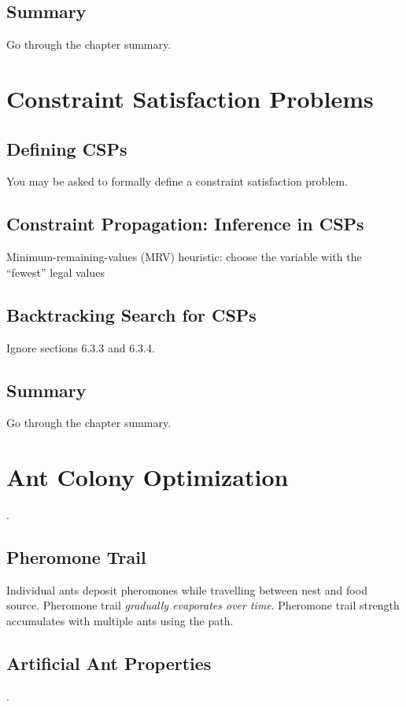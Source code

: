 \documentclass[exam={Midterm},color=true]{cs581exam}
\begin{document}
\subsection{Summary}\label{subsec:5-summary}
Go through the chapter summary.

\section{Constraint Satisfaction Problems}\label{sec:constraint-satisfaction-problems}
\subsection{Defining CSPs}\label{subsec:6.1}
You may be asked to formally define a constraint satisfaction problem.
\subsection{Constraint Propagation: Inference in CSPs}\label{subsec:6.2}
Minimum-remaining-values (MRV) heuristic: choose the variable with the ``fewest'' legal values
%
\subsection{Backtracking Search for CSPs}\label{subsec:6.3}
Ignore sections 6.3.3 and 6.3.4.
\subsection{Summary}\label{subsec:6-summary}
Go through the chapter summary.

\section{Ant Colony Optimization}\label{sec:ant-colony-optimization}

.

\subsection{Pheromone Trail}\label{subsec:pheromone-trail}
Individual ants deposit pheromones while travelling between nest and food source.
Pheromone trail \emph{gradually evaporates over time}.
Pheromone trail strength accumulates with multiple ants using the path.
%
\subsection{Artificial Ant Properties}\label{subsec:artificial-ant-properties}
.
\end{document}
